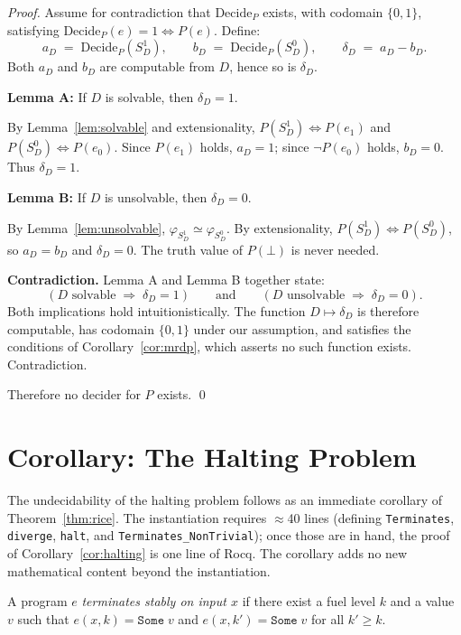 \documentclass{lmcs}
\begin{document}
\begin{proof}
Assume for contradiction that \(\mathrm{Decide}_P\) exists, with codomain
\(\{0,1\}\), satisfying \(\mathrm{Decide}_P(e) = 1 \Leftrightarrow P(e)\).
Define:
\[
  a_D \;=\; \mathrm{Decide}_P(S_D^1), \qquad
  b_D \;=\; \mathrm{Decide}_P(S_D^0), \qquad
  \delta_D \;=\; a_D - b_D.
\]
Both $a_D$ and $b_D$ are computable from $D$, hence so is $\delta_D$.

\medskip
\noindent\textbf{Lemma A:} If $D$ is solvable, then $\delta_D = 1$.

By Lemma~\ref{lem:solvable} and extensionality, $P(S_D^1) \Leftrightarrow P(e_1)$
and $P(S_D^0) \Leftrightarrow P(e_0)$. Since $P(e_1)$ holds, $a_D = 1$; since
$\neg P(e_0)$ holds, $b_D = 0$. Thus $\delta_D = 1$.

\medskip
\noindent\textbf{Lemma B:} If $D$ is unsolvable, then $\delta_D = 0$.

By Lemma~\ref{lem:unsolvable}, $\varphi_{S_D^1} \simeq \varphi_{S_D^0}$. By
extensionality, $P(S_D^1) \Leftrightarrow P(S_D^0)$, so $a_D = b_D$ and
$\delta_D = 0$. The truth value of $P(\bot)$ is never needed.

\medskip
\noindent\textbf{Contradiction.} Lemma A and Lemma B together state:
\[
  (\text{$D$ solvable} \;\Rightarrow\; \delta_D = 1) \qquad \text{and} \qquad
  (\text{$D$ unsolvable} \;\Rightarrow\; \delta_D = 0).
\]
Both implications hold intuitionistically. The function $D \mapsto \delta_D$
is therefore computable, has codomain $\{0,1\}$ under our assumption, and
satisfies the conditions of Corollary~\ref{cor:mrdp},
which asserts no such function exists. Contradiction.

Therefore no decider for $P$ exists. \qed
\end{proof}

\section{Corollary: The Halting Problem}
\label{sec:halting}

The undecidability of the halting problem follows as an immediate corollary
of Theorem~\ref{thm:rice}. The instantiation requires $\approx$40 lines
(defining \texttt{Terminates}, \texttt{diverge}, \texttt{halt}, and
\texttt{Terminates\_NonTrivial}); once those are in hand, the proof
of Corollary~\ref{cor:halting} is one line of Rocq.
The corollary adds no new mathematical content beyond the instantiation.

\begin{defi}
A program $e$ \emph{terminates stably on input $x$} if there exist
a fuel level $k$ and a value $v$ such that $e(x, k) = \mathtt{Some}\;v$
and $e(x, k') = \mathtt{Some}\;v$ for all $k' \geq k$.
\end{defi}
\end{document}
